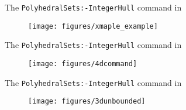 \begin{frame}{The {\tt PolyhedralSets:-IntegerHull} command in {\Maple} }
	\begin{center}
		
		\begin{figure}[H]
			\texttt{[image: figures/xmaple\_example]}
		\end{figure}
	\end{center}
	
\end{frame}
\begin{frame}{The {\tt PolyhedralSets:-IntegerHull} command in {\Maple} }
	\begin{center}
		
		\begin{figure}[H]
			\texttt{[image: figures/4dcommand]}
		\end{figure}
	\end{center}
	
\end{frame}
\begin{frame}{The {\tt PolyhedralSets:-IntegerHull} command in {\Maple}}
	\begin{center}
		
		\begin{figure}[H]
			\texttt{[image: figures/3dunbounded]}
		\end{figure}
	\end{center}
	
\end{frame}
